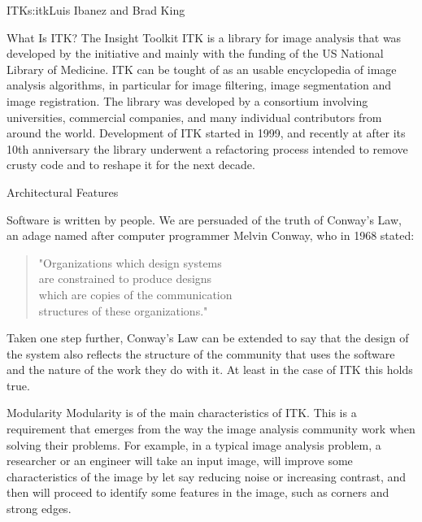 \begin{aosachapter}{ITK}{s:itk}{Luis Ibanez and Brad King}


\begin{aosasect1}{What Is ITK?}
The Insight Toolkit ITK is a library for image analysis that was developed by
the initiative and mainly with the funding of the US National Library of
Medicine. ITK can be tought of as an usable encyclopedia of image analysis
algorithms, in particular for image filtering, image segmentation and image
registration. The library was developed by a consortium involving universities,
commercial companies, and many individual contributors from around the world.
Development of ITK started in 1999, and recently at after its 10th anniversary
the library underwent a refactoring process intended to remove crusty code and
to reshape it for the next decade.
\end{aosasect1}

\begin{aosasect1}{Architectural Features}

Software is written by people. We are persuaded of the truth of Conway's Law,
an adage named after computer programmer Melvin Conway, who in 1968 stated:

\begin{quotation}
"Organizations which design systems\\
are constrained to produce designs\\
which are copies of the communication\\
structures of these organizations."
\end{quotation}

Taken one step further, Conway's Law can be extended to say that the design of
the system also reflects the structure of the community that uses the software
and the nature of the work they do with it. At least in the case of ITK this
holds true.

\begin{aosasect2}{Modularity}
Modularity is of the main characteristics of ITK. This is a requirement that
emerges from the way the image analysis community work when solving their
problems. For example, in a typical image analysis problem, a researcher or an
engineer will take an input image, will improve some characteristics of the
image by let say reducing noise or increasing contrast, and then will proceed
to identify some features in the image, such as corners and strong edges.


\end{aosasect2}
\end{aosasect1}
\end{aosachapter}
